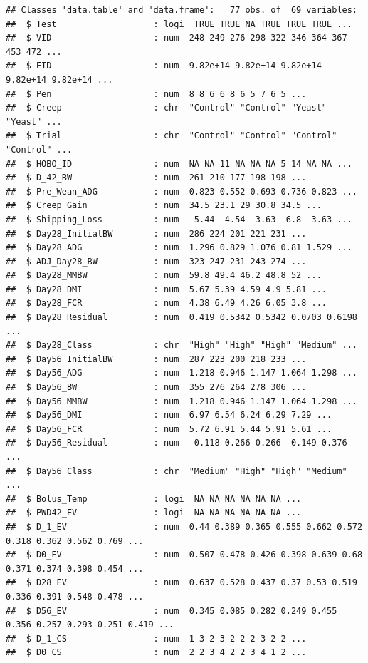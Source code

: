 \documentclass[
]{book}
\begin{document}
\begin{verbatim}
## Classes 'data.table' and 'data.frame':   77 obs. of  69 variables:
##  $ Test                   : logi  TRUE TRUE NA TRUE TRUE TRUE ...
##  $ VID                    : num  248 249 276 298 322 346 364 367 453 472 ...
##  $ EID                    : num  9.82e+14 9.82e+14 9.82e+14 9.82e+14 9.82e+14 ...
##  $ Pen                    : num  8 8 6 6 8 6 5 7 6 5 ...
##  $ Creep                  : chr  "Control" "Control" "Yeast" "Yeast" ...
##  $ Trial                  : chr  "Control" "Control" "Control" "Control" ...
##  $ HOBO_ID                : num  NA NA 11 NA NA NA 5 14 NA NA ...
##  $ D_42_BW                : num  261 210 177 198 198 ...
##  $ Pre_Wean_ADG           : num  0.823 0.552 0.693 0.736 0.823 ...
##  $ Creep_Gain             : num  34.5 23.1 29 30.8 34.5 ...
##  $ Shipping_Loss          : num  -5.44 -4.54 -3.63 -6.8 -3.63 ...
##  $ Day28_InitialBW        : num  286 224 201 221 231 ...
##  $ Day28_ADG              : num  1.296 0.829 1.076 0.81 1.529 ...
##  $ ADJ_Day28_BW           : num  323 247 231 243 274 ...
##  $ Day28_MMBW             : num  59.8 49.4 46.2 48.8 52 ...
##  $ Day28_DMI              : num  5.67 5.39 4.59 4.9 5.81 ...
##  $ Day28_FCR              : num  4.38 6.49 4.26 6.05 3.8 ...
##  $ Day28_Residual         : num  0.419 0.5342 0.5342 0.0703 0.6198 ...
##  $ Day28_Class            : chr  "High" "High" "High" "Medium" ...
##  $ Day56_InitialBW        : num  287 223 200 218 233 ...
##  $ Day56_ADG              : num  1.218 0.946 1.147 1.064 1.298 ...
##  $ Day56_BW               : num  355 276 264 278 306 ...
##  $ Day56_MMBW             : num  1.218 0.946 1.147 1.064 1.298 ...
##  $ Day56_DMI              : num  6.97 6.54 6.24 6.29 7.29 ...
##  $ Day56_FCR              : num  5.72 6.91 5.44 5.91 5.61 ...
##  $ Day56_Residual         : num  -0.118 0.266 0.266 -0.149 0.376 ...
##  $ Day56_Class            : chr  "Medium" "High" "High" "Medium" ...
##  $ Bolus_Temp             : logi  NA NA NA NA NA NA ...
##  $ PWD42_EV               : logi  NA NA NA NA NA NA ...
##  $ D_1_EV                 : num  0.44 0.389 0.365 0.555 0.662 0.572 0.318 0.362 0.562 0.769 ...
##  $ D0_EV                  : num  0.507 0.478 0.426 0.398 0.639 0.68 0.371 0.374 0.398 0.454 ...
##  $ D28_EV                 : num  0.637 0.528 0.437 0.37 0.53 0.519 0.336 0.391 0.548 0.478 ...
##  $ D56_EV                 : num  0.345 0.085 0.282 0.249 0.455 0.356 0.257 0.293 0.251 0.419 ...
##  $ D_1_CS                 : num  1 3 2 3 2 2 2 3 2 2 ...
##  $ D0_CS                  : num  2 2 3 4 2 2 3 4 1 2 ...

\end{verbatim}
\end{document}

